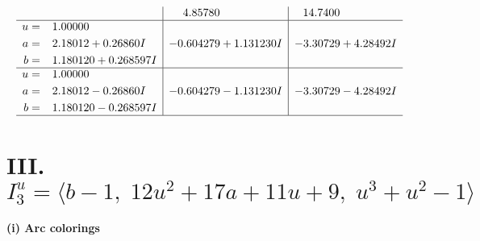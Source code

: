 \documentclass[1p]{elsarticle_modified}
\theoremstyle{definition}
\begin{document}
$$\begin{array}{c|c|c}
 & \phantom{-}4.85780\phantom{ +0.000000I} & \phantom{-}14.7400\phantom{ +0.000000I} \\ \hline\begin{aligned}
u &= \phantom{-}1.00000\phantom{ +0.000000I} \\
a &= \phantom{-}2.18012 + 0.26860 I \\
b &= \phantom{-}1.180120 + 0.268597 I\end{aligned}
 & -0.604279 + 1.131230 I & -3.30729 + 4.28492 I \\ \hline\begin{aligned}
u &= \phantom{-}1.00000\phantom{ +0.000000I} \\
a &= \phantom{-}2.18012 - 0.26860 I \\
b &= \phantom{-}1.180120 - 0.268597 I\end{aligned}
 & -0.604279 - 1.131230 I & -3.30729 - 4.28492 I\\
 \hline 
 \end{array}$$\newpage\newpage\renewcommand{\arraystretch}{1}
\centering \section*{III. $I^u_{3}= \langle b-1,\;12 u^2+17 a+11 u+9,\;u^3+u^2-1 \rangle$}
\flushleft \textbf{(i) Arc colorings}\\
\end{document}
